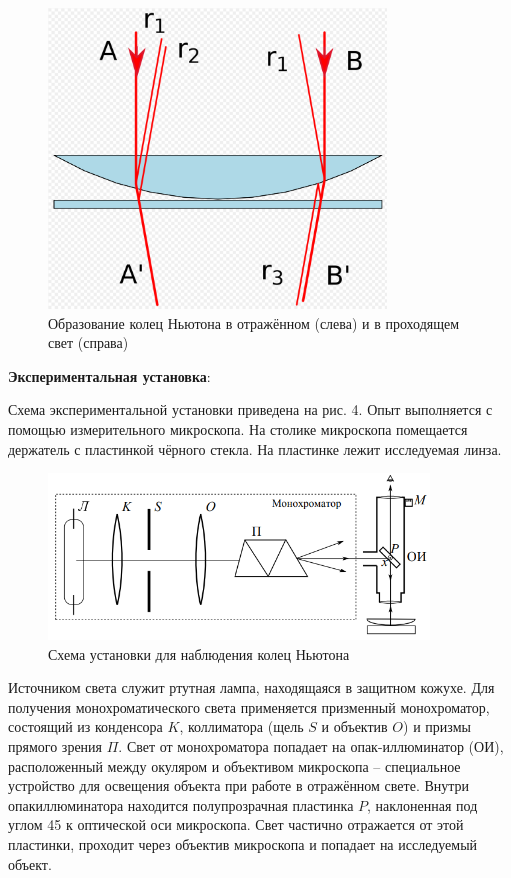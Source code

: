 \documentclass[a4paper,12pt]{article}
\begin{document}
\begin{figure}[H]\label{fig: Отражение лучей от стекла}
    \centering
    \includegraphics[width = 0.8\textwidth]{Отражение лучей от стекла.png}
    \caption{Образование колец Ньютона в отражённом (слева) и в проходящем свет (справа)}
\end{figure}

\textbf{Экспериментальная установка}:

Схема экспериментальной установки приведена на рис. 4. Опыт выполняется с помощью измерительного микроскопа. На столике микроскопа помещается держатель с пластинкой чёрного стекла. На пластинке лежит исследуемая линза.

\begin{figure}[H]\label{fig: Установка}
    \centering
    \includegraphics[width = 0.9\textwidth]{Установка.png}
    \caption{Схема установки для наблюдения колец Ньютона}
\end{figure}

Источником света служит ртутная лампа, находящаяся в защитном кожухе. Для получения монохроматического света применяется призменный монохроматор, состоящий из конденсора $K$, коллиматора (щель $S$ и объектив $O$) и призмы прямого зрения $\Pi$. Свет от
монохроматора попадает на опак-иллюминатор (ОИ), расположенный между окуляром и объективом микроскопа -- специальное устройство для освещения объекта при работе в отражённом свете. Внутри опакиллюминатора находится полупрозрачная пластинка $P$, наклоненная под углом 45\degree{} к оптической оси микроскопа. Свет частично отражается от этой пластинки, проходит через объектив микроскопа и попадает на исследуемый объект.
\end{document}
